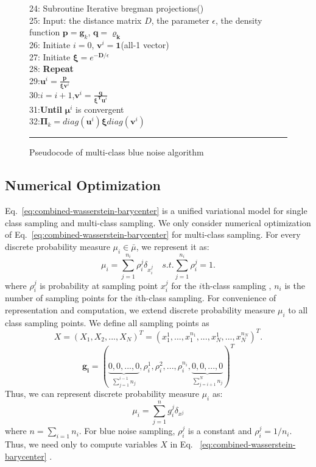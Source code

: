 \begin{figure}[htb]
24: Subroutine Iterative bregman projections()\\
25: Input: the distance matrix $D$, the parameter $\epsilon$,
    the density function $\mathbf{p}=\mathbf{g}_k$,
    $\mathbf{q}=\mathbf{\varrho_{k}}$\\
26: Initiate $i=0$, $\mathbf{v}^i=\mathbf{1}$(all-1 vector)\\
27: Initiate $\mathbf\xi=e^{-\mathbf{D}/\epsilon}$\\
28: \textbf{Repeat}\\
29:\quad $\mathbf{u}^i=\frac{\mathbf{p}}{\mathbf{\xi}\mathbf{v}^i}$\\
30:\quad $i=i+1$,$\mathbf{v}^i=\frac{\mathbf{q}}{\mathbf{\xi}^\mathbf{T}\mathbf{u}^i}$\\
31:\textbf{Until} $\mathbf{\mu}^i$ is convergent\\
32:$\mathbf{\Pi}_k=diag(\mathbf{u}^i)\mathbf{\xi} diag({\mathbf{v}^i})$\\
   \rule{0.47\textwidth}{0.5pt}
  \caption{Pseudocode of multi-class blue noise algorithm}\label{fig:pseudocode}
\end{figure}


\subsection{Numerical Optimization}
Eq.~\ref{eq:combined-wasserstein-barycenter} is a unified variational model for single class sampling and multi-class sampling.
We only consider numerical optimization of Eq.~\ref{eq:combined-wasserstein-barycenter}
for multi-class sampling.
For every discrete probability measure $\mu_i\in\bar\mu$,
we represent it as:
\begin{equation}
 \mu_i=\sum\limits_{j=1}^{n_i}\rho_i^j\delta_{x_i^j} \quad s.t. \sum\limits_{j=1}^{n_i}\rho_i^j=1.
\end{equation}
where $\rho_i^j$ is probability at sampling point $x_i^j$ for the $i$th-class sampling
, $n_i$ is the number of sampling points for the $i$th-class sampling.
For convenience of representation and computation,
we extend discrete probability measure $\mu_i$ to all class sampling points.
We define all sampling points as
\begin{equation}
 X=(X_1,X_2,...,X_N)^T=(x_1^1,...,x_1^{n_1},...,x_N^1,...,x_N^{n_N})^T.
\end{equation}
\begin{equation}
\mathbf{g_i}=(\underbrace{0,0,...,0}_{\sum\limits_{j=1}^{i-1}n_j},\rho_i^1,\rho_i^2,...,\rho_i^{n_i},\underbrace{0,0,...,0}_{\sum\limits_{j=i+1}^{N}n_j})^T
\end{equation}
Thus,
we can represent discrete probability measure $\mu_i$ as:
\begin{equation}
  \mu_i=\sum\limits_{j=1}^{n}g_i^j\delta_{x^j}
\end{equation}
where $n=\sum\limits_{i=1}{n_i}$.
For blue noise sampling,
$\rho_i^j$ is a constant and $\rho_i^j=1/n_i$.
Thus, we need only to compute variables $X$ in Eq. ~\ref{eq:combined-wasserstein-barycenter} .


